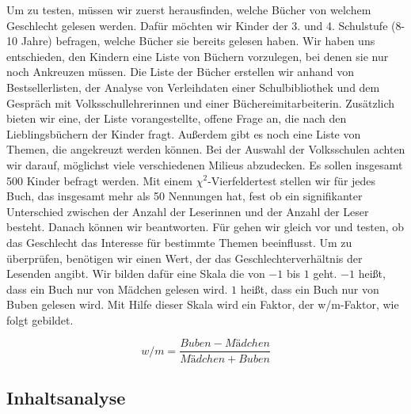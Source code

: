 Um  zu testen, müssen wir zuerst herausfinden, welche
Bücher von welchem Geschlecht gelesen werden. Dafür möchten wir Kinder
der 3. und 4. Schulstufe (8-10 Jahre) befragen, welche Bücher sie
bereits gelesen haben. Wir haben uns entschieden, den Kindern eine Liste
von Büchern vorzulegen, bei denen sie nur noch Ankreuzen müssen. Die
Liste der Bücher erstellen wir anhand von Bestsellerlisten, der Analyse
von Verleihdaten einer Schulbibliothek und dem Gespräch mit
Volksschullehrerinnen und einer Büchereimitarbeiterin. Zusätzlich bieten
wir eine, der Liste vorangestellte, offene Frage an, die nach den
Lieblingsbüchern der Kinder fragt. Außerdem gibt es noch eine Liste von
Themen, die angekreuzt werden können. Bei der Auswahl der Volksschulen
achten wir darauf, möglichst viele verschiedenen Milieus abzudecken. Es
sollen insgesamt 500 Kinder befragt werden. Mit einem
$\chi^2$-Vierfeldertest stellen wir für jedes Buch, das insgesamt mehr
als 50 Nennungen hat, fest ob ein signifikanter Unterschied zwischen der
Anzahl der Leserinnen und der Anzahl der Leser besteht. Danach können
wir  beantworten. Für  gehen wir
gleich vor und testen, ob das Geschlecht das Interesse für bestimmte
Themen beeinflusst. Um  zu überprüfen, benötigen wir
einen Wert, der das Geschlechterverhältnis der Lesenden angibt. Wir
bilden dafür eine Skala die von $-1$ bis $1$ geht. $-1$ heißt, dass ein
Buch nur von Mädchen gelesen wird. $1$ heißt, dass ein Buch nur von
Buben gelesen wird. Mit Hilfe dieser Skala wird ein Faktor, der
w/m-Faktor, wie folgt gebildet.

\begin{equation} w/m=\frac{Buben-Mädchen}{Mädchen+Buben} \end{equation}

\subsection{Inhaltsanalyse}


